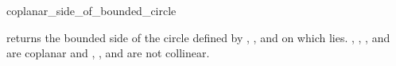 \begin{ccRefFunction}{coplanar_side_of_bounded_circle}

         {returns the bounded side of the circle defined
          by , , and  on which  lies.
          \ccPrecond {}, , , and  are coplanar and
          , , and  are not collinear.}

\end{ccRefFunction}

